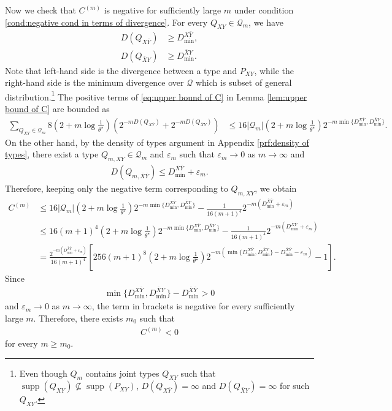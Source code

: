 \documentclass[journal,onecolumn]{IEEEtran}
\theoremstyle{definition}
\theoremstyle{remark}
\newcommand{\Dxby}{D({Q_{X\bar{Y}}})}
\newcommand{\Dbxy}{D({Q_{\bar{X}Y}})}
\newcommand{\Qxy}{Q_{XY}}
\newcommand{\Qxby}{Q_{X\bar{Y}}}
\newcommand{\Qbxy}{Q_{\bar{X}Y}}
\newcommand{\Dxbymin}{D^{X\bar{Y}}_\mathrm{min}}
\newcommand{\Dbxymin}{D^{\bar{X}Y}_\mathrm{min}}
\newcommand{\Dbxbymin}{D^{\bar{X}\bar{Y}}_\mathrm{min}}
\begin{document}
    Now we check that $C^{(m)}$ is negative for sufficiently large $m$ under condition \eqref{cond:negative cond in terms of divergence}.
    For every $\Qxy\in\mathcal Q_m$, we have
    \begin{align*}
        \Dxby
        &\geq
        \Dxbymin,\\
        \Dbxy
        &\geq
        \Dbxymin.
    \end{align*}
    Note that left-hand side is the divergence between a type and $P_{XY}$, 
    while the right-hand side is the minimum divergence over $\mathcal{Q}$ 
    which is subset of general distribution.\footnote{
        Even though $Q_m$ contains joint types $Q_{XY}$ such that
    $\operatorname{supp}(Q_{XY}) \not\subseteq \operatorname{supp}(P_{XY})$, 
    $D(\Qxby)=\infty$ and $D(\Qbxy)=\infty$ for such $Q_{XY}$.
    }
    The positive terms of \eqref{eq:upper bound of C} in Lemma \ref{lem:upper bound of C} are bounded as
    \begin{align*}
        \sum_{\Qxy\in\mathcal Q_m}
        8\left(2+m\log\frac{1}{\theta^\star}\right)
        \left(
            2^{-m\Dxby}
            +
            2^{-m\Dbxy}
        \right)
        &\leq
        16|\mathcal Q_m|
        \left(2+m\log\frac{1}{\theta^\star}\right)
        2^{-m\min\{\Dxbymin,\Dbxymin\}}.
    \end{align*}
    On the other hand, by the density of types argument in Appendix \ref{prf:density of types},
    there exist a type $Q_{m,XY}\in\mathcal Q_m$ and $\varepsilon_m$ such that $\varepsilon_m \to 0$ as $m \to \infty$ and
    \begin{align*}
        D(Q_{m,\bar X\bar Y})
        \leq
        \Dbxbymin+\varepsilon_m.
    \end{align*}
    Therefore, keeping only the negative term corresponding to $Q_{m,XY}$, we obtain
    \begin{align*}
        C^{(m)}
        &\leq
        16|\mathcal Q_m|
        \left(2+m\log\frac{1}{\theta^\star}\right)
        2^{-m\min\{\Dxbymin,\Dbxymin\}}
        -
        \frac{1}{16(m+1)^4}
        2^{-m(\Dbxbymin+\varepsilon_m)}\\
        &\leq
        16(m+1)^4
        \left(2+m\log\frac{1}{\theta^\star}\right)
        2^{-m\min\{\Dxbymin,\Dbxymin\}}
        -
        \frac{1}{16(m+1)^4}
        2^{-m(\Dbxbymin+\varepsilon_m)}\\
        &=
        \frac{2^{-m(\Dbxbymin+\varepsilon_m)}}{16(m+1)^4}
        \left[
            256(m+1)^8
            \left(2+m\log\frac{1}{\theta^\star}\right)
            2^{-m(\min\{\Dxbymin,\Dbxymin\}-\Dbxbymin-\varepsilon_m)}
            -
            1
        \right].
    \end{align*}
    Since
    \begin{align*}
        \min\{\Dxbymin,\Dbxymin\}-\Dbxbymin>0
    \end{align*}
    and $\varepsilon_m\to0$ as $m\to\infty$, the term in brackets is negative for every sufficiently large $m$.
    Therefore, there exists $m_0$ such that
    \begin{align*}
        C^{(m)}<0
    \end{align*}
    for every $m\geq m_0$.
\end{document}
